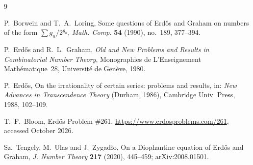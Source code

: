 \documentclass[11pt]{amsart}
\theoremstyle{definition}
\theoremstyle{remark}
\begin{document}
\begin{thebibliography}{9}

P.~Borwein and T.~A.~Loring, Some questions of Erd\H{o}s and Graham on numbers of the form $\sum g_n/2^{g_n}$, \emph{Math. Comp.} \textbf{54} (1990), no.~189, 377--394.

P.~Erd\H{o}s and R.~L.~Graham, \emph{Old and New Problems and Results in Combinatorial Number Theory}, Monographies de L'Enseignement Math\'ematique~28, Universit\'e de Gen\`eve, 1980.

P.~Erd\H{o}s, On the irrationality of certain series: problems and results, in: \emph{New Advances in Transcendence Theory} (Durham, 1986), Cambridge Univ. Press, 1988, 102--109.

T.~F.~Bloom, Erd\H{o}s Problem \#261, \url{https://www.erdosproblems.com/261}, accessed October 2026.

Sz.~Tengely, M.~Ulas and J.~Zygad\l{}o, On a Diophantine equation of Erd\H{o}s and Graham, \emph{J. Number Theory} \textbf{217} (2020), 445--459; arXiv:2008.01501.

\end{thebibliography}
\end{document}
